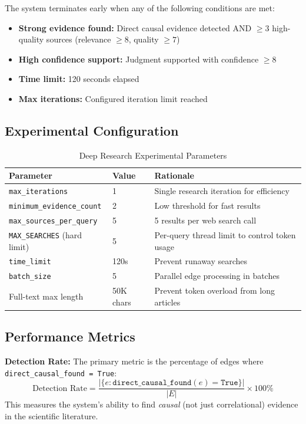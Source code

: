 The system terminates early when any of the following conditions are met:
\begin{itemize}[noitemsep]
    \item \textbf{Strong evidence found:} Direct causal evidence detected AND $\geq$3 high-quality sources (relevance $\geq 8$, quality $\geq 7$)
    \item \textbf{High confidence support:} Judgment supported with confidence $\geq 8$
    \item \textbf{Time limit:} 120 seconds elapsed
    \item \textbf{Max iterations:} Configured iteration limit reached
\end{itemize}

\subsection{Experimental Configuration}

\begin{table}[H]
\centering
\caption{Deep Research Experimental Parameters}
\label{tab:dr_params}
\footnotesize
\begin{tabular}{@{}l l l@{}}
\toprule
\textbf{Parameter} & \textbf{Value} & \textbf{Rationale} \\
\midrule
\texttt{max\_iterations} & 1 & Single research iteration for efficiency \\
\texttt{minimum\_evidence\_count} & 2 & Low threshold for fast results \\
\texttt{max\_sources\_per\_query} & 5 & 5 results per web search call \\
\texttt{MAX\_SEARCHES} (hard limit) & 5 & Per-query thread limit to control token usage \\
\texttt{time\_limit} & 120s & Prevent runaway searches \\
\texttt{batch\_size} & 5 & Parallel edge processing in batches \\
Full-text max length & 50K chars & Prevent token overload from long articles \\
\bottomrule
\end{tabular}
\end{table}

\subsection{Performance Metrics}

\textbf{Detection Rate:} The primary metric is the percentage of edges where \texttt{direct\_causal\_found = True}:
\[
\text{Detection Rate} = \frac{|\{e : \texttt{direct\_causal\_found}(e) = \texttt{True}\}|}{|E|} \times 100\%
\]
This measures the system's ability to find \textit{causal} (not just correlational) evidence in the scientific literature.

